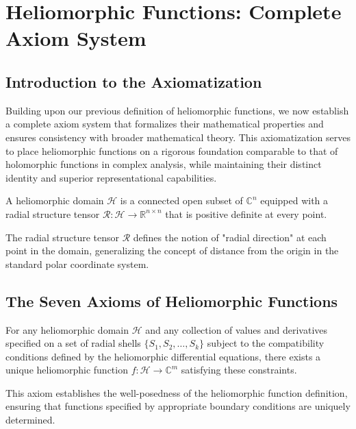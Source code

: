 \chapter{Heliomorphic Functions: Complete Axiom System}

\section{Introduction to the Axiomatization}

Building upon our previous definition of heliomorphic functions, we now establish a complete axiom system that formalizes their mathematical properties and ensures consistency with broader mathematical theory. This axiomatization serves to place heliomorphic functions on a rigorous foundation comparable to that of holomorphic functions in complex analysis, while maintaining their distinct identity and superior representational capabilities.

\begin{definition}
A heliomorphic domain $\mathcal{H}$ is a connected open subset of $\mathbb{C}^n$ equipped with a radial structure tensor $\mathcal{R}: \mathcal{H} \rightarrow \mathbb{R}^{n \times n}$ that is positive definite at every point.
\end{definition}

The radial structure tensor $\mathcal{R}$ defines the notion of "radial direction" at each point in the domain, generalizing the concept of distance from the origin in the standard polar coordinate system.

\section{The Seven Axioms of Heliomorphic Functions}

\begin{axiom}
For any heliomorphic domain $\mathcal{H}$ and any collection of values and derivatives specified on a set of radial shells $\{S_1, S_2, \ldots, S_k\}$ subject to the compatibility conditions defined by the heliomorphic differential equations, there exists a unique heliomorphic function $f: \mathcal{H} \rightarrow \mathbb{C}^m$ satisfying these constraints.
\end{axiom}

This axiom establishes the well-posedness of the heliomorphic function definition, ensuring that functions specified by appropriate boundary conditions are uniquely determined.

